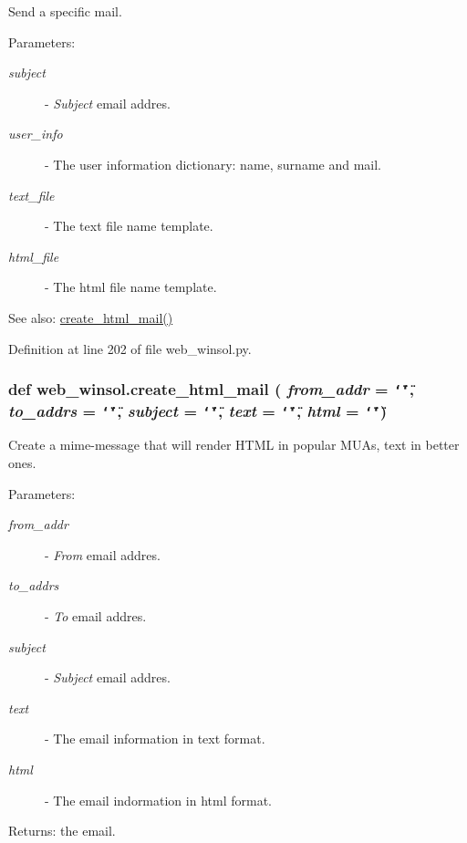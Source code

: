 Send a specific mail. 

\begin{Desc}
\item[Parameters:]
\begin{description}
\item[{\em subject}]- {\em Subject\/} email addres. \item[{\em user\_\-info}]- The user information dictionary: name, surname and mail. \item[{\em text\_\-file}]- The text file name template. \item[{\em html\_\-file}]- The html file name template.\end{description}
\end{Desc}
\begin{Desc}
\item[See also:]\hyperlink{namespaceweb__winsol_cf881f7f7b6f8ac666b967b58521ae14}{create\_\-html\_\-mail()} \end{Desc}


Definition at line 202 of file web\_\-winsol.py.\hypertarget{namespaceweb__winsol_cf881f7f7b6f8ac666b967b58521ae14}{
\subsubsection[create\_\-html\_\-mail]{\setlength{\rightskip}{0pt plus 5cm}def web\_\-winsol.create\_\-html\_\-mail ( {\em from\_\-addr} = {\tt \char`\"{}\char`\"{}},  {\em to\_\-addrs} = {\tt \char`\"{}\char`\"{}},  {\em subject} = {\tt \char`\"{}\char`\"{}},  {\em text} = {\tt \char`\"{}\char`\"{}},  {\em html} = {\tt \char`\"{}\char`\"{}})}}
\label{namespaceweb__winsol_cf881f7f7b6f8ac666b967b58521ae14}


Create a mime-message that will render HTML in popular MUAs, text in better ones. 

\begin{Desc}
\item[Parameters:]
\begin{description}
\item[{\em from\_\-addr}]- {\em From\/} email addres. \item[{\em to\_\-addrs}]- {\em To\/} email addres. \item[{\em subject}]- {\em Subject\/} email addres. \item[{\em text}]- The email information in text format. \item[{\em html}]- The email indormation in html format. \end{description}
\end{Desc}
\begin{Desc}
\item[Returns:]the email. \end{Desc}


